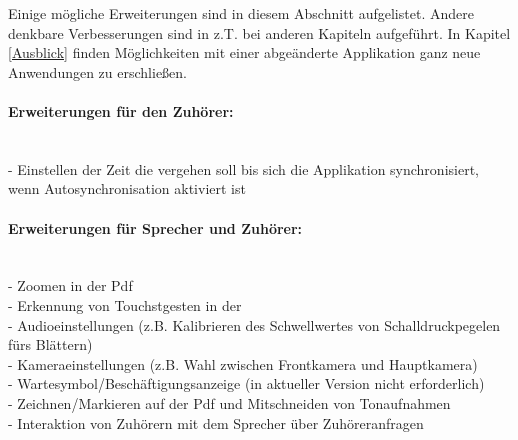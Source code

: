Einige mögliche Erweiterungen sind in diesem Abschnitt aufgelistet. Andere denkbare Verbesserungen sind in z.T. bei anderen Kapiteln aufgeführt. In Kapitel \ref{Ausblick} finden Möglichkeiten mit einer abgeänderte Applikation ganz neue Anwendungen zu erschlie\ss en.

\paragraph{Erweiterungen für den Zuhörer:}$\;$\\
- Einstellen der Zeit die vergehen soll bis sich die Applikation synchronisiert, wenn Autosynchronisation aktiviert ist

\paragraph{Erweiterungen für Sprecher und Zuhörer:}$\;$\\
- Zoomen in der Pdf \\
- Erkennung von Touchstgesten in der \\
- Audioeinstellungen (z.B. Kalibrieren des Schwellwertes von Schalldruckpegelen fürs Blättern)\\
- Kameraeinstellungen (z.B. Wahl zwischen Frontkamera und Hauptkamera)\\
- Wartesymbol/Beschäftigungsanzeige (in aktueller Version nicht erforderlich)\\
- Zeichnen/Markieren auf der Pdf und Mitschneiden von Tonaufnahmen\\
- Interaktion von Zuhörern mit dem Sprecher über Zuhöreranfragen